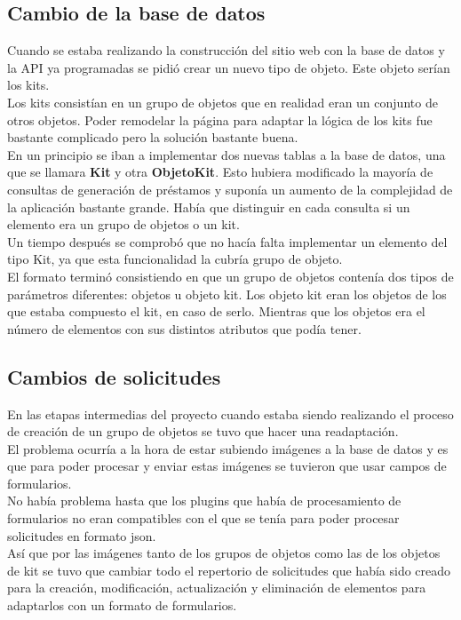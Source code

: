 \subsection{Cambio de la base de datos}
Cuando se estaba realizando la construcción del sitio web con la base de datos y la API ya programadas se pidió crear un nuevo tipo de objeto. Este objeto serían los kits.
\\Los kits consistían en un grupo de objetos que en realidad eran un conjunto de otros objetos. Poder remodelar la página para adaptar la lógica de los kits fue bastante complicado pero la solución bastante buena.
\\En un principio se iban a implementar dos nuevas tablas a la base de datos, una que se llamara \textbf{Kit} y otra \textbf{ObjetoKit}. Esto hubiera modificado la mayoría de consultas de generación de préstamos y suponía un aumento de la complejidad de la aplicación bastante grande. Había que distinguir en cada consulta si un elemento era un grupo de objetos o un kit.
\\Un tiempo después se comprobó que no hacía falta implementar un elemento del tipo Kit, ya que esta funcionalidad la cubría grupo de objeto.
\\El formato terminó consistiendo en que un grupo de objetos contenía dos tipos de parámetros diferentes: objetos u objeto kit. Los objeto kit eran los objetos de los que estaba compuesto el kit, en caso de serlo. Mientras que los objetos era el número de elementos con sus distintos atributos que podía tener.

\subsection{Cambios de solicitudes}
En las etapas intermedias del proyecto cuando estaba siendo realizando el proceso de creación de un grupo de objetos se tuvo que hacer una readaptación.
\\El problema ocurría a la hora de estar subiendo imágenes a la base de datos y es que para poder procesar y enviar estas imágenes se tuvieron que usar campos de formularios.
\\No había problema hasta que los plugins que había de procesamiento de formularios no eran compatibles con el que se tenía para poder procesar solicitudes en formato json.
\\Así que por las imágenes tanto de los grupos de objetos como las de los objetos de kit se tuvo que cambiar todo el repertorio de solicitudes que había sido creado para la creación, modificación, actualización y eliminación de elementos para adaptarlos con un formato de formularios.

